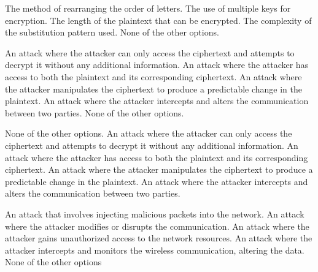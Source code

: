 \begin{checkboxes}
    \choice The method of rearranging the order of letters.
    \choice The use of multiple keys for encryption.
    \choice The length of the plaintext that can be encrypted.
    \CorrectChoice The complexity of the substitution pattern used.
    \choice None of the other options.
\end{checkboxes}

\begin{checkboxes}
    \CorrectChoice An attack where the attacker can only access the ciphertext and attempts to decrypt it without any additional information.
    \choice An attack where the attacker has access to both the plaintext and its corresponding ciphertext.
    \choice An attack where the attacker manipulates the ciphertext to produce a predictable change in the plaintext.
    \choice An attack where the attacker intercepts and alters the communication between two parties.
    \choice None of the other options.
\end{checkboxes}

\begin{checkboxes}
    \CorrectChoice None of the other options.
    \choice An attack where the attacker can only access the ciphertext and attempts to decrypt it without any additional information.
    \choice An attack where the attacker has access to both the plaintext and its corresponding ciphertext.
    \choice An attack where the attacker manipulates the ciphertext to produce a predictable change in the plaintext.
    \choice An attack where the attacker intercepts and alters the communication between two parties.
\end{checkboxes}

\begin{checkboxes}
    \choice An attack that involves injecting malicious packets into the network.
    \choice An attack where the attacker modifies or disrupts the communication.
    \choice An attack where the attacker gains unauthorized access to the network resources.
    \choice An attack where the attacker intercepts and monitors the wireless communication, altering the data.
    \CorrectChoice None of the other options
\end{checkboxes}